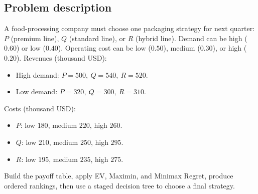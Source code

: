

	
	\begin{ExamProblems}
		\item
		\subsection*{Problem description}
		A food-processing company must choose one packaging strategy for next quarter:
		$P$ (premium line), $Q$ (standard line), or $R$ (hybrid line).
		Demand can be high ($0.60$) or low ($0.40$).
		Operating cost can be low ($0.50$), medium ($0.30$), or high ($0.20$).
		Revenues (thousand USD):
		\begin{itemize}
			\item High demand: $P=500,\ Q=540,\ R=520$.
			\item Low demand: $P=320,\ Q=300,\ R=310$.
		\end{itemize}
		Costs (thousand USD):
		\begin{itemize}
			\item $P$: low $180$, medium $220$, high $260$.
			\item $Q$: low $210$, medium $250$, high $295$.
			\item $R$: low $195$, medium $235$, high $275$.
		\end{itemize}
		Build the payoff table, apply EV, Maximin, and Minimax Regret, produce ordered rankings, then use a staged decision tree to choose a final strategy.


\end{ExamProblems}
